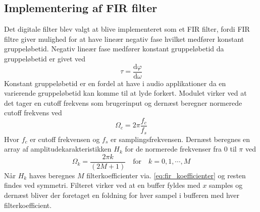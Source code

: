 \subsection{Implementering af FIR filter}
Det digitale filter blev valgt at blive implementeret som et FIR filter, fordi FIR filtre giver mulighed for at have lineær negativ fase hvilket medfører konstant gruppeløbetid.\newline
Negativ lineær fase medfører konstant gruppeløbetid da gruppeløbetid er givet ved
\[
\tau = \frac{\mathrm{d}\varphi}{\mathrm{d}\omega}
\]
Konstant gruppeløbetid er en fordel at have i audio applikationer da en varierende gruppeløbetid kan komme til at lyde forkert.\newline
Modulet virker ved at det tager en cutoff frekvens som brugerinput og dernæst beregner normerede cutoff frekvens ved
\[ \Omega_c = 2\pi\frac{f_c}{f_s} \]
Hvor $f_c$ er cutoff frekvensen og $f_s$ er samplingsfrekvensen.
Dernæst beregnes en array af amplitudekarakteristikken $H_k$ for de normerede frekvenser fra $0$ til $\pi$ ved 
\[ \Omega_k = \frac{2\pi k}{(2M + 1)} \quad \mathrm{for} \quad k = 0, 1, \cdots, M \]
Når $H_k$ haves beregnes $M$ filterkoefficienter via. \ref{eq:fir_koefficienter} og resten findes ved symmetri.\newline
Filteret virker ved at en buffer fyldes med $x$ samples og dernæst bliver der foretaget en foldning for hver sampel i bufferen med hver filterkoefficient.

